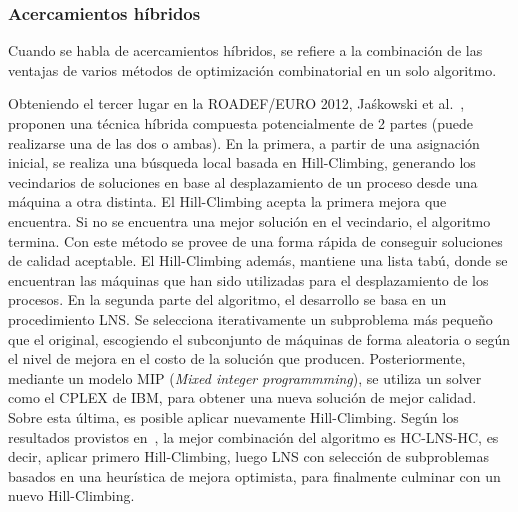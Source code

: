 \documentclass[../informe2.tex]{subfiles}
\begin{document}
\subsubsection{Acercamientos híbridos}
Cuando se habla de acercamientos híbridos, se refiere a la combinación de las ventajas de varios métodos de optimización combinatorial en un solo algoritmo. \par
\noindent Obteniendo el tercer lugar en la ROADEF/EURO 2012, Jaśkowski et al.~\cite{jaskowskihybrid}, proponen una técnica híbrida compuesta potencialmente de 2 partes (puede realizarse una de las dos o ambas). En la primera, a partir de una asignación inicial, se realiza una búsqueda local basada en Hill-Climbing, generando los vecindarios de soluciones en base al desplazamiento de un proceso desde una máquina a otra distinta. El Hill-Climbing acepta la primera mejora que encuentra. Si no se encuentra una mejor solución en el vecindario, el algoritmo termina. Con este método se provee de una forma rápida de conseguir soluciones de calidad aceptable. El Hill-Climbing además, mantiene una lista tabú, donde se encuentran las máquinas que han sido utilizadas para el desplazamiento de los procesos. En la segunda parte del algoritmo, el desarrollo se basa en un procedimiento LNS\@. Se selecciona iterativamente un subproblema más pequeño que el original, escogiendo el subconjunto de máquinas de forma aleatoria o según el nivel de mejora en el costo de la solución que producen. Posteriormente, mediante un modelo MIP (\emph{Mixed integer programmming}), se utiliza un solver como el CPLEX de IBM, para obtener una nueva solución de mejor calidad. Sobre esta última, es posible aplicar nuevamente Hill-Climbing. Según los resultados provistos en~\cite{jaskowskihybrid}, la mejor combinación del algoritmo es HC-LNS-HC, es decir, aplicar primero Hill-Climbing, luego LNS con selección de subproblemas basados en una heurística de mejora optimista, para finalmente culminar con un nuevo Hill-Climbing. \par
\bigskip
\end{document}
